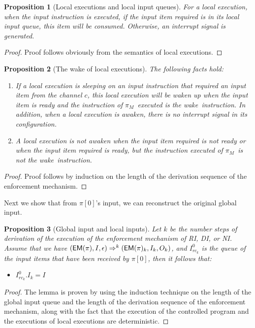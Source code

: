 \documentclass[10pt,a4paper,oneside]{article}
\newtheorem{proposition}{Proposition}[section]
\def\Irck#1#2{\ensuremath{I_{rc_{#2}}^{#1}}}
\def\ProgM{\ensuremath{\Prog_{M}}}
\def\chnl{\ensuremath{c}}
\def\sanserif#1{\ensuremath{\sf #1}}
\def\emptyQ{\ensuremath{\epsilon}}
\def\EM{\ensuremath{{\sanserif{EM}}}}
\def\Prog{\ensuremath{\pi}}
\def\Progl#1{\ensuremath{\Prog[#1]}}
\def\EMP{\ensuremath{\EM(}\ensuremath{\Prog)}}
\def\NWAKE{wake}
\begin{document}
\begin{proposition}[Local executions and local input queues] \label{prop:reuse:local}
For a local execution, when the input instruction is executed, if the input item required is in its local input queue, this item will be consumed. Otherwise, an interrupt signal is generated.
\end{proposition}
\begin{proof}
Proof follows obviously from the semantics of local executions.
\end{proof}

\begin{proposition}[The wake of local executions]
\label{prop:reuse:global}
The following facts hold:
\begin{enumerate}
\item If a local execution is sleeping on an input instruction that required an input item from the channel \chnl, this local execution will be waken up when the input item is ready and the instruction of \ProgM\ executed is the \NWAKE\ instruction. In addition, when a local execution is awaken, there is no interrupt signal in its configuration.

\item A local execution is not awaken when the input item required is not ready or when the input item required is ready, but the instruction executed of \ProgM\ is not the \NWAKE\ instruction.

\end{enumerate}
\end{proposition}

\begin{proof}
Proof follows by induction on the length of the derivation sequence of the enforcement mechanism.
\end{proof}

Next we show that from \Progl{0}'s input, we can reconstruct the original global input.

\begin{proposition}[Global input and local inputs] \label{prop:relationship:localinputqueue}
Let $k$ be the number steps of derivation of the execution of the enforcement mechanism of RI, DI, or NI. Assume that we have $(\EMP, I, \emptyQ) \Rightarrow^k (\EMP_k, I_k, O_k)$, and \Irck{0}{k} is the queue of the input items that have been received by \Progl{0}, then it follows that: \begin{itemize}
\item $\Irck{0}{k}.I_k = I$
\end{itemize}
\end{proposition}
\begin{proof}
The lemma is proven by using the induction technique on the length of the global input queue and the length of the derivation sequence of the enforcement mechanism, along with the fact that the execution of the controlled program and the executions of local executions are deterministic.
\end{proof}
\end{document}
